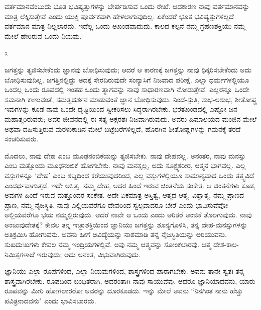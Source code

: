ವರ್ತಮಾನವೆಂಬುದು ಭೂತ ಭವಿಷ್ಯತ್ತುಗಳನ್ನು ಬೇರ್ಪಡಿಸುವ ಒಂದು ರೇಖೆ. ಆದಕಾರಣ ನಾವು ವರ್ತಮಾನವನ್ನು ಮಾತ್ರ ಲೆಕ್ಕಿಸುತ್ತೇವೆ ಎಂದು ಯುಕ್ತಿ ಪೂರ್ವಕವಾಗಿ ಹೇಳಲಾಗುವುದಿಲ್ಲ. ಏಕೆಂದರೆ ಭೂತ ಭವಿಷ್ಯತ್ತುಗಳಿಲ್ಲದೆ ವರ್ತಮಾನ ಮಾತ್ರ ನಿಲ್ಲಲಾರದು. ಇದೆಲ್ಲ ಒಂದು ಅಖಂಡವಾದುದು. ಕಾಲದ ಕಲ್ಪನೆ ನಮ್ಮ ಗ್ರಹಣಶಕ್ತಿಯು ನಮ್ಮ ಮೇಲೆ ಹೇರಿರುವ ಒಂದು ನಿಯಮ.

\begin{center}
೩
\end{center}

ಜಗತ್ತನ್ನು ತ್ಯಜಿಸಬೇಕೆಂದು ಜ್ಞಾನವು ಬೋಧಿಸುವುದು; ಆದರೆ ಆ ಕಾರಣಕ್ಕೆ ಜಗತ್ತನ್ನು ನಾವು ಧಿಕ್ಕರಿಸಬೇಕೆಂದು ಅದು ಬೋಧಿಸುವುದಿಲ್ಲ. ಜಗತ್ತಿನಲ್ಲಿದ್ದು ಅದಕ್ಕೆ ಸೇರದಿರುವುದೇ ಸಂನ್ಯಾಸಿಗೆ ನಿಜವಾದ ಪರೀಕ್ಷೆ. ಎಲ್ಲಾ ಧರ್ಮಗಳಲ್ಲಿಯೂ ಒಂದಲ್ಲ ಒಂದು ರೂಪದಲ್ಲಿ ಇಂತಹ ಒಂದು ತ್ಯಾಗವನ್ನು ನಾವು ಸಾಧಾರಣವಾಗಿ ನೋಡುತ್ತೇವೆ. ಎಲ್ಲರನ್ನೂ ಒಂದೇ ಸಮನಾಗಿ ಕಾಣುವಂತೆ, ಸಮತ್ವದರ್ಶನ ಮಾಡುವಂತೆ ಜ್ಞಾನ ಬೋಧಿಸುವುದು. ನಿಂದೆ-ಸ್ತುತಿ, ಶುಭ-ಅಶುಭ, ಶೀತೋಷ್ಣ ಇವುಗಳನ್ನು ಕೂಡ ನಾವು ಒಂದೇ ದೃಷ್ಟಿಯಿಂದ ಸ್ವೀಕರಿಸಲು ಸಿದ್ಧರಾಗಿರಬೇಕು. ಭರತಖಂಡದಲ್ಲಿ ಎಷ್ಟೋ ಜನ ಮಹಾತ್ಮರಿರುವರು; ಅವರ ಜೀವನದಲ್ಲಿ ಈ ಸತ್ಯ ಅಕ್ಷರಶಃ ನಿಜವಾಗಿರುವುದು. ಅವರು ಹಿಮಾಲಯದ ಮಂಜಿನ ಮೇಲೆ ಅಥವಾ ದಹಿಸುತ್ತಿರುವ ಮರಳುಕಾಡಿನ ಮೇಲೆ ಬಟ್ಟೆಬರೆಗಳಿಲ್ಲದೆ, ಹೊರಗಿನ ಶೀತೋಷ್ಣಗಳನ್ನು ಗಮನಕ್ಕೆ ತರದೆ ಸಂಚರಿಸುವರು.

ಮೊದಲು, ನಾವು ದೇಹ ಎಂಬ ಮೂಢನಂಬಿಕೆಯನ್ನು ತ್ಯಜಿಸಬೇಕು. ನಾವು ದೇಹವಲ್ಲ. ಅನಂತರ, ನಾವು ಮನಸ್ಸು ಎಂಬ ಮತ್ತೊಂದು ಮೂಢನಂಬಿಕೆ ಹೋಗಬೇಕು. ನಾವು ಮನಸ್ಸಲ್ಲ, ಅದು ಸೂಕ್ಷ್ಮಶರೀರ, ಆತ್ಮನ ಭಾಗವಲ್ಲ. ಎಲ್ಲ ವಸ್ತುಗಳನ್ನೂ `ದೇಹ' ಎಂಬ ಶಬ್ದದಿಂದ ಕರೆಯುವುದರಿಂದ, ಎಲ್ಲ ವಸ್ತುಗಳಲ್ಲಿಯೂ ಸಾಮಾನ್ಯವಾದ ಒಂದು ತತ್ತ್ವವಿದೆ ಎಂದರ್ಥವಾಗುತ್ತದೆ. ಇದೇ ಅಸ್ತಿತ್ವ. ನಮ್ಮ ದೇಹ, ಅದರ ಹಿಂದೆ ಇರುವ ಚಿಂತನೆಯ ಸಂಕೇತ. ಆ ಚಿಂತನೆಗಳು ಕೂಡ, ಅವುಗಳ ಹಿಂದೆ ಇರುವ ಮತ್ತೊಂದರ ಸಂಕೇತ. ಅದೇ ಏಕಮಾತ್ರ ಅಸ್ತಿತ್ವ, ಆತ್ಮದ ಆತ್ಮ, ವಿಶ್ವಾತ್ಮ, ನಮ್ಮ ಪ್ರಾಣದ ಪ್ರಾಣ, ನಮ್ಮ ನೈಜಸ್ಥಿತಿ. ನಾವು ಎಲ್ಲಿಯವರೆಗೂ ದೇವರಿಂದ ಸ್ವಲ್ಪವಾದರೂ ಬೇರೆ ಎಂದು ಭಾವಿಸುವೆವೋ ಅಲ್ಲಿಯವರೆಗೂ ಭಯ ನಮ್ಮಲ್ಲಿರುವುದು. ಆದರೆ ನಾವೇ ಆ ಒಂದು ಎಂದು ಅರಿತರೆ ಅಂಜಿಕೆ ತೊಲಗುವುದು. ನಾವು ಅಂಜುವುದೇತಕ್ಕೆ? ಕೇವಲ ತನ್ನ ಇಚ್ಛಾಶಕ್ತಿಯಿಂದ ಜ್ಞಾನಿಯು ಜಗತ್ತನ್ನು ಶೂನ್ಯಗೊಳಿಸಿ, ತನ್ನ ದೇಹ-ಮನಸ್ಸುಗಳನ್ನು ಅತಿಕ್ರಮಿಸಿ ಹೋಗುವನು. ಅವನು ಹೀಗೆ ಅವಿದ್ಯೆಯನ್ನು ನಾಶಮಾಡಿ ತನ್ನ ನೈಜಸ್ಥಿತಿಯನ್ನು ಅರಿಯುವನು. ಸುಖದುಃಖಗಳು ಕೇವಲ ನಮ್ಮ ಇಂದ್ರಿಯಗಳಲ್ಲಿವೆ. ಅವು ನಮ್ಮ ಆತ್ಮವನ್ನು ಸೋಂಕಲಾರವು. ಆತ್ಮ ದೇಶ-ಕಾಲ-ನಿಮಿತ್ತಗಳಾಚೆ ಇರುವುದು; ಅದು ಅನಂತ, ವಿಭುವಾಗಿರುವುದು.

ಜ್ಞಾನಿಯು ಎಲ್ಲಾ ರೂಪಗಳಿಂದ, ಎಲ್ಲಾ ನಿಯಮಗಳಿಂದ, ಶಾಸ್ತ್ರಗಳಿಂದ ಪಾರಾಗಬೇಕು. ಅವನು ತಾನೇ ಸ್ವತಃ ತನ್ನ ಶಾಸ್ತ್ರವಾಗಿರಬೇಕು. ರೂಪದಿಂದ ಬಂಧಿತರಾಗಿ, ಅದರಂತಾಗಿ ನಾವು ಸಾಯುವೆವು. ಆದರೂ ಜ್ಞಾನಿಯಾದವನು, ಯಾರು ರೂಪವನ್ನು ಮೀರಿ ಹೋಗಲಾರರೋ ಅವರನ್ನು ದೂರಕೂಡದು. ಇನ್ನು ಮೇಲೆ ಅವನು “ನಿನಗಿಂತ ನಾನು ಹೆಚ್ಚು ಪವಿತ್ರನಾದವನು" ಎಂದು ಭಾವಿಸಬಾರದು.

